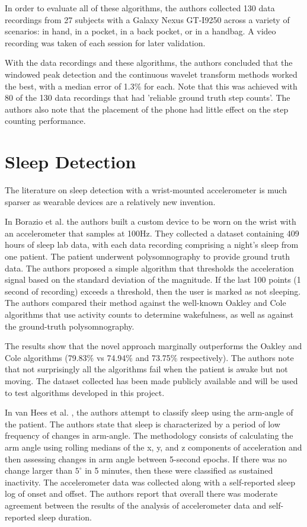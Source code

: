                 In order to evaluate all of these algorithms, the authors collected 130 data recordings from 27 subjects with a Galaxy Nexus GT-I9250 across a variety of scenarios: in hand, in a pocket, in a back pocket, or in a handbag. A video recording was taken of each session for later validation.

                With the data recordings and these algorithms, the authors concluded that the windowed peak detection and the continuous wavelet transform methods worked the best, with a median error of 1.3\% for each. Note that this was achieved with 80 of the 130 data recordings that had 'reliable ground truth step counts'. The authors also note that the placement of the phone had little effect on the step counting performance. 


        \section{Sleep Detection}

            The literature on sleep detection with a wrist-mounted accelerometer is much sparser as wearable devices are a relatively new invention. 

            In Borazio et al. \cite{borazio} the authors built a custom device to be worn on the wrist with an accelerometer that samples at 100Hz. They collected a dataset containing 409 hours of sleep lab data, with each data recording comprising a night's sleep from one patient. The patient underwent polysomnography to provide ground truth data. The authors proposed a simple algorithm that thresholds the acceleration signal based on the standard deviation of the magnitude. If the last 100 points (1 second of recording) exceeds a threshold, then the user is marked as not sleeping. The authors compared their method against the well-known Oakley \cite{oakley} and Cole \cite{cole} algorithms that use activity counts to determine wakefulness, as well as against the ground-truth polysomnography. 

            The results show that the novel approach marginally outperforms the Oakley and Cole algorithms (79.83\% vs 74.94\% and 73.75\% respectively). The authors note that not surprisingly all the algorithms fail when the patient is awake but not moving. The dataset collected has been made publicly available and will be used to test algorithms developed in this project.

            In van Hees et al. \cite{vanhees}, the authors attempt to classify sleep using the arm-angle of the patient. The authors state that sleep is characterized by a period of low frequency of changes in arm-angle. The methodology consists of calculating the arm angle using rolling medians of the x, y, and z components of acceleration and then assessing changes in arm angle between 5-second epochs. If there was no change larger than $5^{\circ}$ in 5 minutes, then these were classified as sustained inactivity. The accelerometer data was collected along with a self-reported sleep log of onset and offset. The authors report that overall there was moderate agreement between the results of the analysis of accelerometer data and self-reported sleep duration.